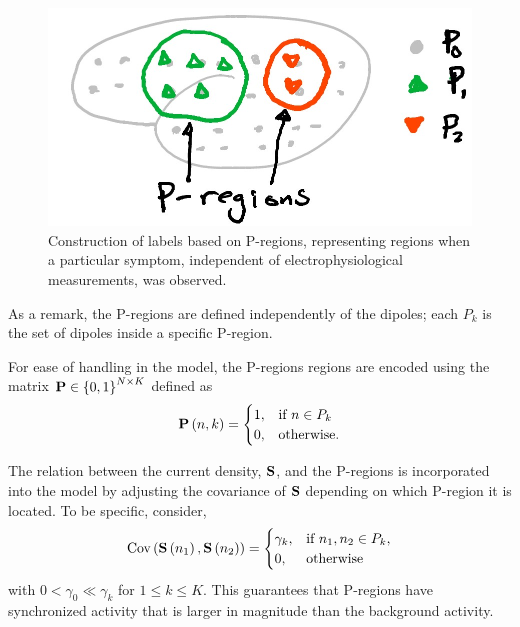 \begin{figure}
    \centering 
    \includegraphics[width=0.6\linewidth]{./img_dev/Pregions.jpg}
    \caption{Construction of labels based on P-regions, representing regions when a particular symptom, independent of electrophysiological measurements, was observed.}
\end{figure}

As a remark, the P-regions are defined independently of the dipoles; each $P_k$ is the set of dipoles inside a specific P-region.

For ease of handling in the model, the P-regions regions are encoded using the matrix 
$\mathbf{P}\in \left\{ 0,1 \right\}^{N\times K}$ defined as
\begin{equation}
    \mathbf{P}\left( n,k \right) = \begin{cases}
        1, &\text{if } n \in P_k \\
        0, &\text{otherwise.}
    \end{cases}
\end{equation}



The relation between the current density, $\mathbf{S}$, and the P-regions is incorporated into the model by adjusting the covariance of $\mathbf{S}$ depending on which P-region it is located.
%
To be specific, consider,
\begin{equation}
    \text{Cov}\left( \mathbf{S}\left( n_1 \right), \mathbf{S}\left( n_2 \right) \right) = 
    \begin{cases}
        \gamma_k, & \text{if } n_1, n_2\in P_k, \\
        0, & \text{otherwise}
    \end{cases}
\end{equation}
with $0 < \gamma_0 \ll \gamma_k$ for $1\leq k \leq K$.
%
This guarantees that P-regions have synchronized activity that is larger in magnitude than the background activity.

